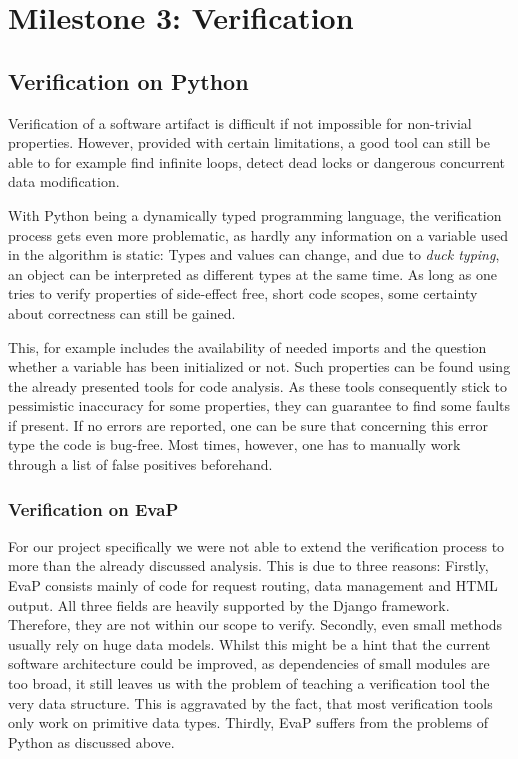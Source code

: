 \section{Milestone 3: Verification}

\subsection{Verification on Python}

Verification of a software artifact is difficult if not impossible for non-trivial properties.
However, provided with certain limitations, a good tool can still be able to for example find infinite loops, detect dead locks or dangerous concurrent data modification.

With Python being a dynamically typed programming language, the verification process gets even more problematic, as hardly any information on a variable used in the algorithm is static:
Types and values can change, and due to \textit{duck typing}, an object can be interpreted as different types at the same time.
As long as one tries to verify properties of side-effect free, short code scopes, some certainty about correctness can still be gained.

This, for example includes the availability of needed imports and the question whether a variable has been initialized or not.
Such properties can be found using the already presented tools for code analysis.
As these tools consequently stick to pessimistic inaccuracy for some properties, they can guarantee to find some faults if present.
If no errors are reported, one can be sure that concerning this error type the code is bug-free.
Most times, however, one has to manually work through a list of false positives beforehand.

\subsubsection{Verification on EvaP}

For our project specifically we were not able to extend the verification process to more than the already discussed analysis.
This is due to three reasons:
Firstly, EvaP consists mainly of code for request routing, data management and HTML output.
All three fields are heavily supported by the Django framework. Therefore, they are not within our scope to verify.
Secondly, even small methods usually rely on huge data models.
Whilst this might be a hint that the current software architecture could be improved, as dependencies of small modules are too broad, it still leaves us with the problem of teaching a verification tool the very data structure.
This is aggravated by the fact, that most verification tools only work on primitive data types.
Thirdly, EvaP suffers from the problems of Python as discussed above.

